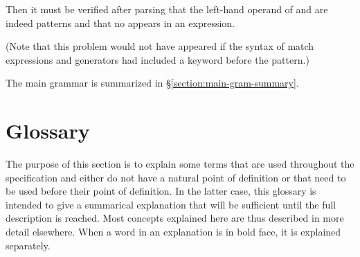 Then it must be verified after parsing that the left-hand operand of \TXT{=} and
\TXT{<-} are indeed patterns and that no  appears in an
expression.

(Note that this problem would not have appeared if the syntax of
match expressions and generators
had included a keyword before the pattern.)

The main grammar is summarized in \S\ref{section:main-gram-summary}.

\section{Glossary}

The purpose of this section is to explain some terms that are used
throughout the specification and either do not have a natural point of
definition or that need to be used before their point of definition.
In the latter case, this glossary is intended to give a summarical
explanation that will be sufficient until the full description is
reached.  Most concepts explained here are thus described in more
detail elsewhere.  When a word in an explanation is in bold face, it
is explained separately.

